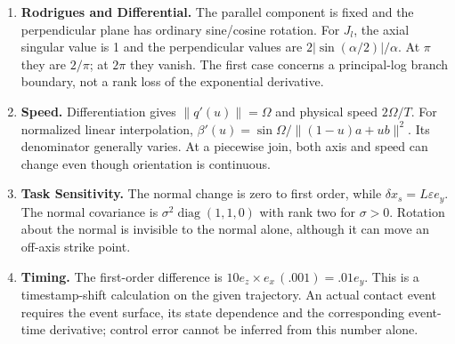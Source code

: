 \begin{enumerate}
\item \textbf{Rodrigues and Differential.} The parallel component is fixed and the perpendicular plane has ordinary sine/cosine rotation. For $J_l$, the axial singular value is 1 and the perpendicular values are $2|\sin(\alpha/2)|/\alpha$. At $\pi$ they are $2/\pi$; at $2\pi$ they vanish. The first case concerns a principal-log branch boundary, not a rank loss of the exponential derivative.
\item \textbf{Speed.} Differentiation gives $\|q'(u)\|=\Omega$ and physical speed $2\Omega/T$. For normalized linear interpolation, $\beta'(u)=\sin\Omega/\|(1-u)a+ub\|^2$. Its denominator generally varies. At a piecewise join, both axis and speed can change even though orientation is continuous.
\item \textbf{Task Sensitivity.} The normal change is zero to first order, while $\delta x_s=L\varepsilon e_y$. The normal covariance is $\sigma^2\operatorname{diag}(1,1,0)$ with rank two for $\sigma>0$. Rotation about the normal is invisible to the normal alone, although it can move an off-axis strike point.
\item \textbf{Timing.} The first-order difference is $10e_z\times e_x\,(.001)=.01e_y$. This is a timestamp-shift calculation on the given trajectory. An actual contact event requires the event surface, its state dependence and the corresponding event-time derivative; control error cannot be inferred from this number alone.
\end{enumerate}

